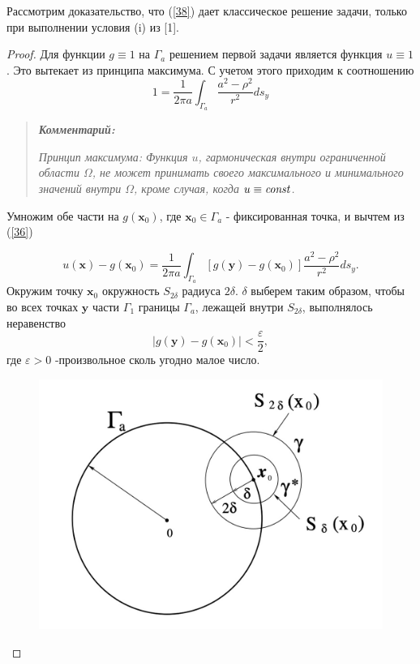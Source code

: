 \documentclass[14pt, a4paper]{extarticle}
\let\oldref\ref
\renewcommand{\ref}[1]{(\oldref{#1})}
\begin{document}
					\noindent Рассмотрим доказательство, что \ref{38} дает классическое решение задачи, только при выполнении условия (i) из [1].
					\begin{proof}Для функции $g \equiv 1$ на $\Gamma_a$ решением первой задачи является функция $u \equiv 1$. Это вытекает из принципа максимума. С учетом этого приходим к соотношению 
					\begin{equation}
						1 = \dfrac{1}{2\pi a} \int_{\Gamma_a} \dfrac{a^2 - \rho^2}{r^2} ds_y \label{39}
					\end{equation}			
					\begin{framed}
						\begin{quote}
					\textit{\textbf{Комментарий:}} 
					
					\textit{Принцип максимума: Функция $u$, гармоническая внутри ограниченной области $\Omega$, не может принимать своего максимального и минимального значений внутри $\Omega$, кроме случая, когда $u \equiv \emph{const}$.}\\
						\end{quote}
					\end{framed}
					Умножим обе части на $g(\mathbf{x}_0)$, где $\mathbf{x}_0 \in \Gamma_a$ - фиксированная точка, и вычтем из \ref{36}
					
					\begin{equation}
						u(\mathbf{x}) - g(\mathbf{x}_0) = \dfrac{1}{2 \pi a} \int_{\Gamma_a} [ g(\mathbf{y}) - g(\mathbf{x}_0) ] \dfrac{a^2-\rho^2}{r^2}ds_y. \label{40}
					\end{equation}
					Окружим точку $\mathbf{x}_0$ окружность $S_{2\delta}$ радиуса $2\delta$. $\delta$ выберем таким образом, чтобы во всех точках $\mathbf{y}$ части $\Gamma_1$ границы $\Gamma_a$, лежащей внутри $S_{2\delta}$, выполнялось неравенство
					\begin{equation}
						|g(\mathbf{y}) - g(\mathbf{x}_0)| < \dfrac{\varepsilon}{2}, \label{41}
					\end{equation}
					где $\varepsilon > 0$ -произвольное сколь угодно малое число. 
					
					\begin{figure}[H]
						\centering
						\includegraphics[width = .5\linewidth]{1.jpg}
						\caption[.] {}
					\end{figure}
					

\end{proof}
\end{document}

